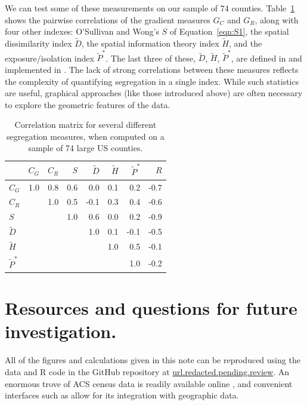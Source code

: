 \documentclass{article}
\theoremstyle{theorem}
\theoremstyle{definition}
\begin{document}
We can test some of these measurements on our sample of 74 counties. Table~\ref{tab:indexcor} shows the pairwise correlations of the gradient measures $G_C$ and $G_R$, along with four other indexes: O'Sullivan and Wong's $S$ of Equation~\ref{eqn:S1}, the spatial dissimilarity index $\tilde{D}$, the spatial information theory index $\tilde{H}$, and the exposure/isolation index $\tilde{P}^*$. The last three of these, $\tilde{D}$, $\tilde{H}$, $\tilde{P}^*$, are defined in \cite{reardonosullivan04} and implemented in \cite{hong14}. The lack of strong correlations between these measures reflects the complexity of quantifying segregation in a single index. While such statistics are useful, graphical approaches (like those introduced above) are often necessary to explore the geometric features of the data.

\begin{table}[bt]
\centering
\begin{tabular}{l|rrrrrrr} %
   & $C_G$ & $C_R$ & $S$ & $\tilde{D}$ &  $\tilde{H}$ & $\tilde{P}^*$ & $R$ \\
  \hline
  $C_G$ & 1.0 & 0.8 & 0.6 & 0.0 & 0.1 & 0.2 & -0.7 \\
  $C_R$ &  & 1.0 & 0.5 & -0.1 & 0.3 & 0.4 & -0.6 \\
  $S$ &  &  & 1.0 & 0.6 & 0.0 & 0.2 & -0.9 \\
  $\tilde{D}$ &  &  &  & 1.0 & 0.1 & -0.1 & -0.5 \\
  $\tilde{H}$ &  &  &  &  & 1.0 & 0.5 & -0.1\\
  $\tilde{P}^*$ &  &  &  &  &  & 1.0 & -0.2  \\
\end{tabular}
\caption{Correlation matrix for several different segregation measures, when computed on a sample of 74 large US counties.}
\label{tab:indexcor}
\end{table}


\section{Resources and questions for future investigation.}

All of the figures and calculations given in this note can be reproduced using the data and R code in the GitHub repository at
\url{url.redacted.pending.review}. An enormous trove of ACS census data is readily available online \cite{acs19}, and convenient interfaces such as \cite{walker19} allow for its integration with geographic data.
\end{document}
